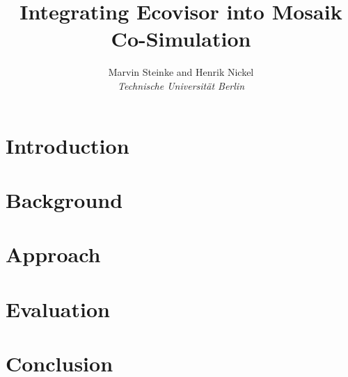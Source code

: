 \documentclass[a4paper, twoside]{IEEEtran}
\begin{document}
\title{Integrating Ecovisor into Mosaik Co-Simulation}

\author{Marvin Steinke and Henrik Nickel\\\textit{Technische Universität Berlin}}


\maketitle

\begin{abstract}
\end{abstract}


\section{Introduction}

\section{Background}

\section{Approach}

\section{Evaluation}

\section{Conclusion}




\end{document}
